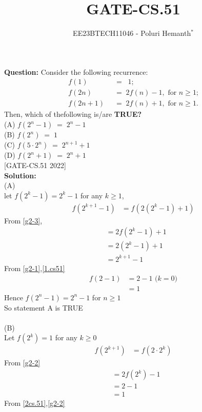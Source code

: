 \documentclass[journal,12pt,twocolumn]{IEEEtran}
\theoremstyle{remark}
\begin{document}

\vspace{3cm}

\title{GATE-CS.51}
\author{EE23BTECH11046 - Poluri Hemanth$^{*}$}
\maketitle
\textbf{Question:}
Consider the following recurrence:
\begin{align}
	f(1)\;\;&=\;\;1;\label{g2-1}\\
	 f(2n)\;\;&=\;2f(n)-1,\text{  for $n\geq$1;}\label{g2-2}\\
	 f(2n+1)\;\;&=\;2f(n)+1,\text{  for $n\geq$1.}\label{g2-3}
\end{align}
Then, which of thefollowing is/are \textbf{TRUE?}\\
(A) $f(2^n-1)\;=\;2^n-1$\\
(B) $f(2^n)\;=\;1$\\
(C) $f(5\cdot2^n)\;=\;2^{n+1}+1$\\
(D) $f(2^n+1)\;=\;2^n+1$\\
\hfill{[GATE-CS.51 2022]}\\
\textbf{Solution:}\\
(A)\\
let $f(2^k-1)=2^k-1$ for any $k\geq1$,
\begin{align}
	f(2^{k+1}-1)&=f(2(2^k-1)+1)
\end{align}
From \eqref{g2-3},
\begin{align}
	&=2f(2^k-1)+1\\
        &=2(2^k-1)+1\\
	&=2^{k+1}-1\label{1.cs51}
\end{align}
From \eqref{g2-1},\eqref{1.cs51}
\begin{align}
	f(2-1)&=2-1\text{  ($k=0$)}\\
	&=1
\end{align}
Hence $f(2^n-1)=2^n-1$ for $n\geq1$\\
So statement A is TRUE\\
\\(B)\\
Let $f(2^k)=1$ for any $k\geq$0
\begin{align}
	f(2^{k+1})&=f(2\cdot2^k)
\end{align}
From \eqref{g2-2}
\begin{align}
	&=2f(2^k)-1\label{2cs.51}\\
	&=2-1\\
	&=1
\end{align}
From \eqref{2cs.51},\eqref{g2-2}
\end{document}
